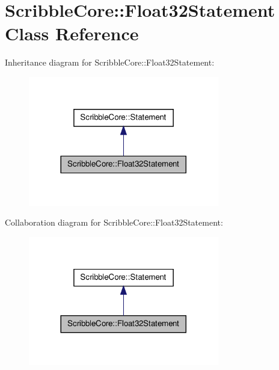 \hypertarget{class_scribble_core_1_1_float32_statement}{\section{Scribble\-Core\-:\-:Float32\-Statement Class Reference}
\label{class_scribble_core_1_1_float32_statement}
}


Inheritance diagram for Scribble\-Core\-:\-:Float32\-Statement\-:
\nopagebreak
\begin{figure}[H]
\begin{center}
\leavevmode
\includegraphics[width=236pt]{class_scribble_core_1_1_float32_statement__inherit__graph}
\end{center}
\end{figure}


Collaboration diagram for Scribble\-Core\-:\-:Float32\-Statement\-:
\nopagebreak
\begin{figure}[H]
\begin{center}
\leavevmode
\includegraphics[width=236pt]{class_scribble_core_1_1_float32_statement__coll__graph}
\end{center}
\end{figure}
